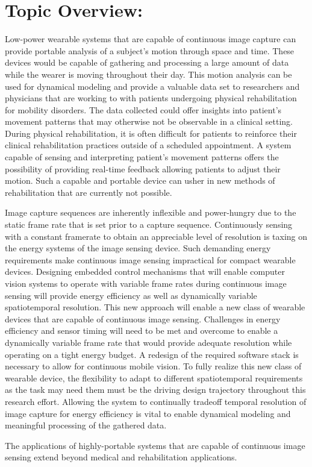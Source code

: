 \section{Topic Overview:}

\indent Low-power wearable systems that are capable of continuous image capture can provide portable analysis of a subject's motion through
space and time. These devices would be capable of gathering and processing a large amount of data while the wearer is moving throughout their
day. This motion analysis can be used for dynamical modeling and provide a valuable data set to researchers and physicians that are working
to with patients undergoing physical rehabilitation for mobility disorders. The data collected could offer insights into patient's movement
patterns that may otherwise not be observable in a clinical setting. During physical rehabilitation, it is often difficult for patients to
reinforce their clinical rehabilitation practices outside of a scheduled appointment. A system capable of sensing and interpreting patient's
movement patterns offers the possibility of providing real-time feedback allowing patients to adjust their motion. Such a capable and portable
device can usher in new methods of rehabilitation that are currently not possible.

\indent Image capture sequences are inherently inflexible and power-hungry due to the static frame rate that is set prior to a capture
sequence. Continuously sensing with a constant framerate to obtain an appreciable level of resolution is taxing on the energy systems of the
image sensing device. Such demanding energy requirements make continuous image sensing impractical for compact wearable devices. Designing embedded
control mechanisms that will enable computer vision systems to operate with variable frame rates during continuous image sensing will provide energy
efficiency as well as dynamically variable spatiotemporal resolution. This new approach will enable a new class of wearable devices that are capable
of continuous image sensing. Challenges in energy efficiency and sensor timing will need to be met and overcome to enable a dynamically variable frame
rate that would provide adequate resolution while operating on a tight energy budget. A redesign of the required software stack is necessary to allow
for continuous mobile vision. To fully realize this new class of wearable device, the flexibility to adapt to different spatiotemporal requirements as
the task may need them must be the driving design trajectory throughout this research effort. Allowing the system to continually tradeoff temporal
resolution of image capture for energy efficiency is vital to enable dynamical modeling and meaningful processing of the gathered data.

\indent The applications of highly-portable systems that are capable of continuous image sensing extend beyond medical and rehabilitation applications.


